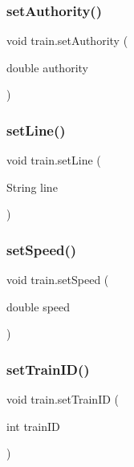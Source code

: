 \subsubsection{\texorpdfstring{set\+Authority()}{setAuthority()}}
{\footnotesize\ttfamily void train.\+set\+Authority (\begin{DoxyParamCaption}\item[{double}]{authority }\end{DoxyParamCaption})}

\mbox{\label{classtrain_a0c64747d8c11a6b68d802c4159d2911c}} 
\subsubsection{\texorpdfstring{set\+Line()}{setLine()}}
{\footnotesize\ttfamily void train.\+set\+Line (\begin{DoxyParamCaption}\item[{String}]{line }\end{DoxyParamCaption})}

\mbox{\label{classtrain_aa655ee4487d9476b21faab1e71d816f9}} 
\subsubsection{\texorpdfstring{set\+Speed()}{setSpeed()}}
{\footnotesize\ttfamily void train.\+set\+Speed (\begin{DoxyParamCaption}\item[{double}]{speed }\end{DoxyParamCaption})}

\mbox{\label{classtrain_aca453b158d99ac2c56ac31fbd6d23b64}} 
\subsubsection{\texorpdfstring{set\+Train\+I\+D()}{setTrainID()}}
{\footnotesize\ttfamily void train.\+set\+Train\+ID (\begin{DoxyParamCaption}\item[{int}]{train\+ID }\end{DoxyParamCaption})}



